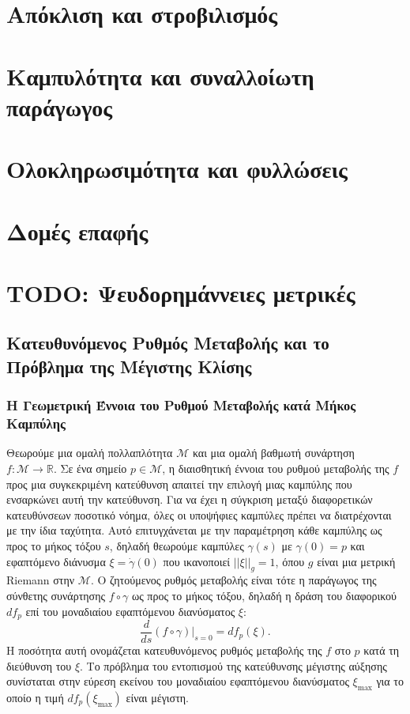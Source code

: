\documentclass[11pt,a4paper,twoside,openright]{book}
\begin{document}
\chapter{Απόκλιση και στροβιλισμός}
	\label{chapter:divergence-and-curl}
	
\chapter{Καμπυλότητα και συναλλοίωτη παράγωγος}
	\label{chapter:covariant-derivative}
	
\chapter{Ολοκληρωσιμότητα και φυλλώσεις}
	\label{chapter:integrability-and-foliations}
	
\chapter{Δομές επαφής}
	\label{chapter:foliations}
	
\chapter{TODO: Ψευδορημάννειες μετρικές}
	
\section{Κατευθυνόμενος Ρυθμός Μεταβολής και το Πρόβλημα της Μέγιστης Κλίσης}

\subsection{Η Γεωμετρική Έννοια του Ρυθμού Μεταβολής κατά Μήκος Καμπύλης}

Θεωρούμε μια ομαλή πολλαπλότητα \(\mathcal{M}\) και μια ομαλή βαθμωτή συνάρτηση \(f: \mathcal{M} \to \mathbb{R}\). Σε ένα σημείο \(p \in \mathcal{M}\), η διαισθητική έννοια του ρυθμού μεταβολής της \(f\) προς μια συγκεκριμένη κατεύθυνση απαιτεί την επιλογή μιας καμπύλης που ενσαρκώνει αυτή την κατεύθυνση. Για να έχει η σύγκριση μεταξύ διαφορετικών κατευθύνσεων ποσοτικό νόημα, όλες οι υποψήφιες καμπύλες πρέπει να διατρέχονται με την ίδια ταχύτητα. Αυτό επιτυγχάνεται με την παραμέτρηση κάθε καμπύλης ως προς το μήκος τόξου \(s\), δηλαδή θεωρούμε καμπύλες \(\gamma(s)\) με \(\gamma(0) = p\) και εφαπτόμενο διάνυσμα \(\xi = \dot{\gamma}(0)\) που ικανοποιεί \(||\xi||_g = 1\), όπου \(g\) είναι μια μετρική Riemann στην \(\mathcal{M}\). Ο ζητούμενος ρυθμός μεταβολής είναι τότε η παράγωγος της σύνθετης συνάρτησης \(f \circ \gamma\) ως προς το μήκος τόξου, δηλαδή η δράση του διαφορικού \(df_p\) επί του μοναδιαίου εφαπτόμενου διανύσματος \(\xi\):
\[
\frac{d}{ds}(f \circ \gamma)\Big|_{s=0} = df_p(\xi).
\]
Η ποσότητα αυτή ονομάζεται κατευθυνόμενος ρυθμός μεταβολής της \(f\) στο \(p\) κατά τη διεύθυνση του \(\xi\). Το πρόβλημα του εντοπισμού της κατεύθυνσης μέγιστης αύξησης συνίσταται στην εύρεση εκείνου του μοναδιαίου εφαπτόμενου διανύσματος \(\xi_{\text{max}}\) για το οποίο η τιμή \(df_p(\xi_{\text{max}})\) είναι μέγιστη.
\end{document}
